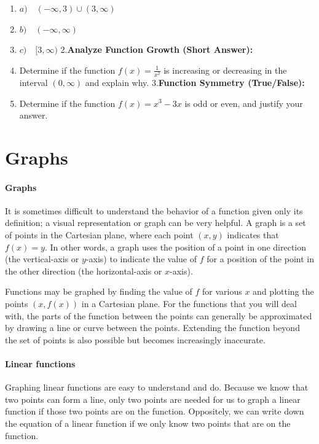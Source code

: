 \begin{enumerate}
    \item $a) \quad (-\infty, 3) \cup (3, \infty)$
    \item $b) \quad (-\infty, \infty)$
    \item $c) \quad [3, \infty)$ 2.\textbf{Analyze Function Growth (Short Answer):}
    \item Determine if the function $ f(x) = \frac{1}{x^2} $ is increasing or decreasing in the interval $ (0, \infty) $ and explain why. 3.\textbf{Function Symmetry (True/False):}
    \item Determine if the function $ f(x) = x^3 - 3x $ is odd or even, and justify your answer.
\end{enumerate}

\section{Graphs}
\label{sec:graphs}

\paragraph{Graphs}

It is sometimes difficult to understand the behavior of a function given only its definition; a visual representation or graph can be very helpful. A graph is a set of points in the Cartesian plane, where each point $(x, y)$ indicates that $f(x) = y$. In other words, a graph uses the position of a point in one direction (the vertical-axis or $y$-axis) to indicate the value of $f$ for a position of the point in the other direction (the horizontal-axis or $x$-axis).

Functions may be graphed by finding the value of $f$ for various $x$ and plotting the points $(x, f(x))$ in a Cartesian plane. For the functions that you will deal with, the parts of the function between the points can generally be approximated by drawing a line or curve between the points. Extending the function beyond the set of points is also possible but becomes increasingly inaccurate.

\paragraph{Linear functions}

Graphing linear functions are easy to understand and do. Because we know that two points can form a line, only two points are needed for us to graph a linear function if those two points are on the function. Oppositely, we can write down the equation of a linear function if we only know two points that are on the function.


